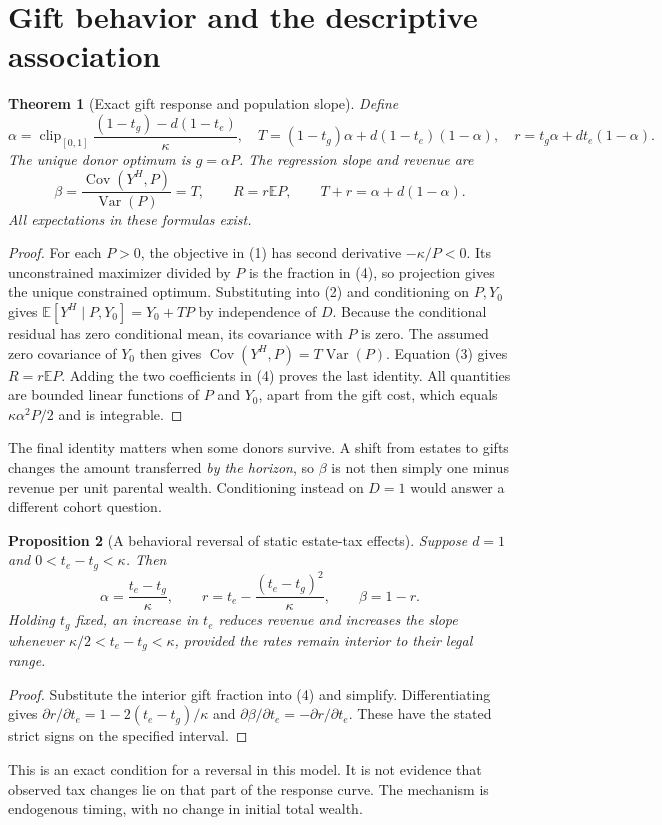 \documentclass[11pt]{article}
\newtheorem{theorem}{Theorem}
\newtheorem{proposition}[theorem]{Proposition}
\theoremstyle{remark}
\newcommand{\E}{\mathbb E}
\newcommand{\Var}{\operatorname{Var}}
\newcommand{\Cov}{\operatorname{Cov}}
\newcommand{\clip}{\operatorname{clip}}
\begin{document}
\section{Gift behavior and the descriptive association}
\begin{theorem}[Exact gift response and population slope]
Define
\[
 \alpha=\clip_{[0,1]}
 \frac{(1-t_g)-d(1-t_e)}\kappa,
 \quad
 T=(1-t_g)\alpha+d(1-t_e)(1-\alpha),
 \quad r=t_g\alpha+dt_e(1-\alpha).
 \tag{4}
\]
The unique donor optimum is $g=\alpha P$. The regression slope and revenue
are
\[
 \beta=\frac{\Cov(Y^H,P)}{\Var(P)}=T,
 \qquad R=r\E P,\qquad T+r=\alpha+d(1-\alpha). \tag{5}
\]
All expectations in these formulas exist.
\end{theorem}
\begin{proof}
For each $P>0$, the objective in (1) has second derivative $-\kappa/P<0$.
Its unconstrained maximizer divided by $P$ is the fraction in (4), so
projection gives the unique constrained optimum. Substituting into (2)
and conditioning on $P,Y_0$ gives
$\E[Y^H\mid P,Y_0]=Y_0+TP$ by independence of $D$.
Because the conditional residual has zero conditional mean, its covariance
with $P$ is zero. The assumed zero covariance of $Y_0$ then gives
$\Cov(Y^H,P)=T\Var(P)$. Equation (3) gives $R=r\E P$.
Adding the two coefficients in (4) proves the last identity. All quantities
are bounded linear functions of $P$ and $Y_0$, apart from the gift cost,
which equals $\kappa\alpha^2P/2$ and is integrable.
\end{proof}
The final identity matters when some donors survive. A shift from estates
to gifts changes the amount transferred \emph{by the horizon}, so
$\beta$ is not then simply one minus revenue per unit parental wealth.
Conditioning instead on $D=1$ would answer a different cohort question.

\begin{proposition}[A behavioral reversal of static estate-tax effects]
Suppose $d=1$ and $0<t_e-t_g<\kappa$. Then
\[
 \alpha=\frac{t_e-t_g}{\kappa},\qquad
 r=t_e-\frac{(t_e-t_g)^2}{\kappa},\qquad \beta=1-r.
 \tag{6}
\]
Holding $t_g$ fixed, an increase in $t_e$ reduces revenue and increases the
slope whenever $\kappa/2<t_e-t_g<\kappa$, provided the rates remain
interior to their legal range.
\end{proposition}
\begin{proof}
Substitute the interior gift fraction into (4) and simplify.
Differentiating gives $\partial r/\partial t_e=1-2(t_e-t_g)/\kappa$
and $\partial\beta/\partial t_e=-\partial r/\partial t_e$.
These have the stated strict signs on the specified interval.
\end{proof}
This is an exact condition for a reversal in this model. It is not evidence
that observed tax changes lie on that part of the response curve. The
mechanism is endogenous timing, with no change in initial total wealth.
\end{document}
